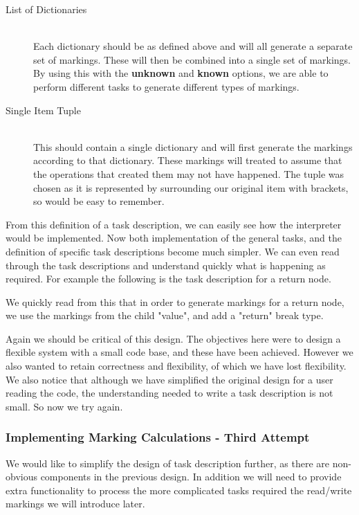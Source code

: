 \documentclass[twoside,a4paper]{report}
\begin{document}
\begin{description}
\item[List of Dictionaries] \hfill \\
Each dictionary should be as defined above and will all generate a separate set of markings. These will then be combined into a single set of markings.
By using this with the \textbf{unknown} and \textbf{known} options, we are able to perform different tasks to generate different types of markings.

\item[Single Item Tuple] \hfill \\
This should contain a single dictionary and will first generate the markings according to that dictionary. These markings will treated to assume that
the operations that created them may not have happened. The tuple was chosen as it is represented by surrounding our original item with brackets, so
would be easy to remember.
\end{description}

From this definition of a task description, we can easily see how the interpreter would be implemented. Now both implementation of the general tasks, and
the definition of specific task descriptions become much simpler. We can even read through the task descriptions and understand quickly what is happening
as required. For example the following is the task description for a return node.



We quickly read from this that in order to generate markings for a return node, we use the markings from the child "value", and add a "return" break type.

Again we should be critical of this design. The objectives here were to design a flexible system with a small code base, and these have been achieved.
However we also wanted to retain correctness and flexibility, of which we have lost flexibility. We also notice that although we have simplified the
original design for a user reading the code, the understanding needed to write a task description is not small. So now we try again.

\subsubsection{Implementing Marking Calculations - Third Attempt}

We would like to simplify the design of task description further, as there are non-obvious components in the previous design. In addition we will
need to provide extra functionality to process the more complicated tasks required the read/write markings we will introduce later.
\end{document}
